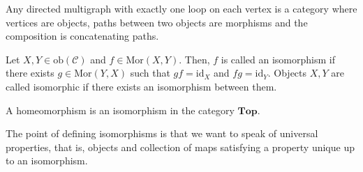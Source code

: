 \documentclass[12pt,reqno]{amsart}
\numberwithin{theorem}{section}
\theoremstyle{definition}
\theoremstyle{remark}
\numberwithin{equation}{section}
\newcommand{\cC}{\mathcal{C}}
\theoremstyle{definition}
\newcommand{\ob}{\mathrm{ob}}
\newcommand{\id}{\mathrm{id}}
\newcommand{\Mor}{\mathrm{Mor}}
\begin{document}
\begin{example}
    Any directed multigraph with exactly one loop on each vertex is a category where vertices are objects, paths between two objects are morphisms and the composition is concatenating paths.
\end{example}
\begin{definition}
    Let $X,Y \in \ob(\cC)$ and $f\in \Mor(X,Y)$.  Then, $f$ is called an isomorphism if there exists $g \in \Mor(Y,X)$ such that $gf = \id_X$ and $fg = \id_Y$. Objects $X,Y$ are called isomorphic if there exists an isomorphism between them.
\end{definition}
\begin{example}
    A homeomorphism is an isomorphism in the category $\mathbf{Top}$.
\end{example}
The point of defining isomorphisms is that we want to speak of universal properties, that is, objects and collection of maps satisfying a property unique up to an isomorphism.
\end{document}
